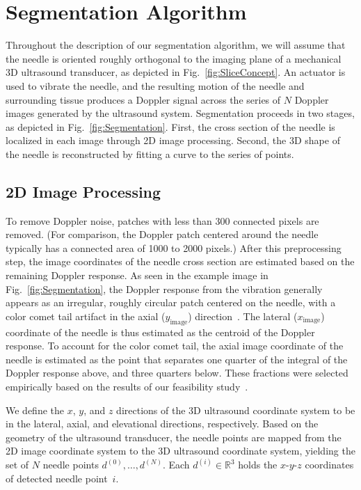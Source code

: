 \section{Segmentation Algorithm}
\label{sec:Algorithms}
Throughout the description of our segmentation algorithm, we will assume that the needle is oriented roughly orthogonal to the imaging plane of a mechanical 3D ultrasound transducer, as depicted in Fig.~\ref{fig:SliceConcept}. An actuator is used to vibrate the needle, and the resulting motion of the needle and surrounding tissue produces a Doppler signal across the series of $N$ Doppler images generated by the ultrasound system. Segmentation proceeds in two stages, as depicted in Fig.~\ref{fig:Segmentation}. First, the cross section of the needle is localized in each image through 2D image processing. Second, the 3D shape of the needle is reconstructed by fitting a curve to the series of points.

\subsection{2D Image Processing}
To remove Doppler noise, patches with less than 300 connected pixels are removed. (For comparison, the Doppler patch centered around the needle typically has a connected area of 1000 to 2000 pixels.) After this preprocessing step, the image coordinates of the needle cross section are estimated based on the remaining Doppler response. As seen in the example image in Fig.~\ref{fig:Segmentation}, the Doppler response from the vibration generally appears as an irregular, roughly circular patch centered on the needle, with a color comet tail artifact in the axial ($y_\text{image}$) direction~\cite{Tchelepi2009}. The lateral ($x_\text{image}$) coordinate of the needle is thus estimated as the centroid of the Doppler response. To account for the color comet tail, the axial image coordinate of the needle is estimated as the point that separates one quarter of the integral of the Doppler response above, and three quarters below. These fractions were selected empirically based on the results of our feasibility study~\cite{Adebar2013}. 

We define the $x$, $y$, and $z$ directions of the 3D ultrasound coordinate system to be in the lateral, axial, and elevational directions, respectively. Based on the geometry of the ultrasound transducer, the needle points are mapped from the 2D image coordinate system to the 3D ultrasound coordinate system, yielding the set of $N$ needle points $d^{(0)}, \dotsc, d^{(N)}$. Each $d^{(i)} \in \mathbb{R}^{3}$ holds the $x$-$y$-$z$ coordinates of detected needle point~$i$.

